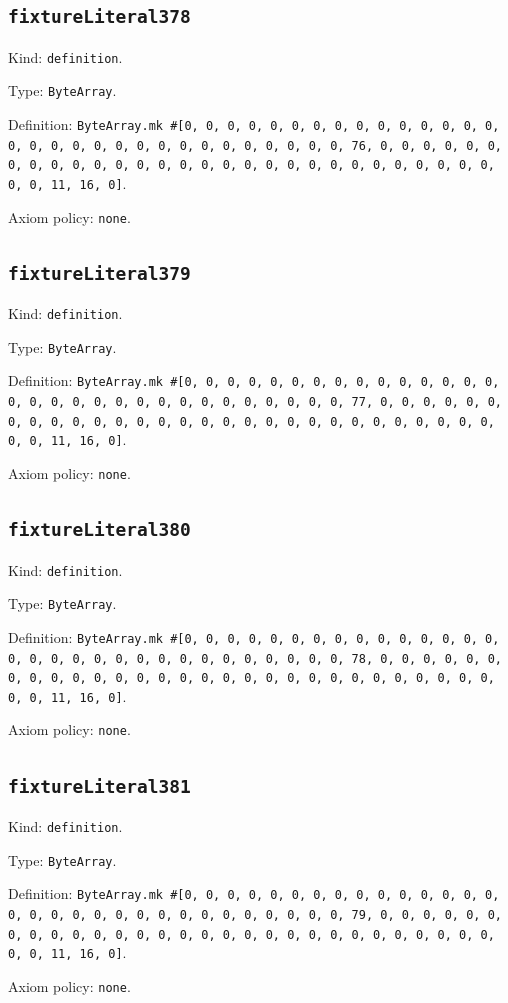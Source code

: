 \documentclass[11pt]{article}
\begin{document}
\subsection*{\texttt{fixtureLiteral378}}
\noindent Kind: \texttt{definition}.\par
\noindent Type: \texttt{ByteArray}.\par
\noindent Definition: \texttt{ByteArray.mk \#[0, 0, 0, 0, 0, 0, 0, 0, 0, 0, 0, 0, 0, 0, 0, 0, 0, 0, 0, 0, 0, 0, 0, 0, 0, 0, 0, 0, 0, 0, 0, 76, 0, 0, 0, 0, 0, 0, 0, 0, 0, 0, 0, 0, 0, 0, 0, 0, 0, 0, 0, 0, 0, 0, 0, 0, 0, 0, 0, 0, 0, 0, 0, 11, 16, 0]}.\par
\noindent Axiom policy: \texttt{none}.\par
\subsection*{\texttt{fixtureLiteral379}}
\noindent Kind: \texttt{definition}.\par
\noindent Type: \texttt{ByteArray}.\par
\noindent Definition: \texttt{ByteArray.mk \#[0, 0, 0, 0, 0, 0, 0, 0, 0, 0, 0, 0, 0, 0, 0, 0, 0, 0, 0, 0, 0, 0, 0, 0, 0, 0, 0, 0, 0, 0, 0, 77, 0, 0, 0, 0, 0, 0, 0, 0, 0, 0, 0, 0, 0, 0, 0, 0, 0, 0, 0, 0, 0, 0, 0, 0, 0, 0, 0, 0, 0, 0, 0, 11, 16, 0]}.\par
\noindent Axiom policy: \texttt{none}.\par
\subsection*{\texttt{fixtureLiteral380}}
\noindent Kind: \texttt{definition}.\par
\noindent Type: \texttt{ByteArray}.\par
\noindent Definition: \texttt{ByteArray.mk \#[0, 0, 0, 0, 0, 0, 0, 0, 0, 0, 0, 0, 0, 0, 0, 0, 0, 0, 0, 0, 0, 0, 0, 0, 0, 0, 0, 0, 0, 0, 0, 78, 0, 0, 0, 0, 0, 0, 0, 0, 0, 0, 0, 0, 0, 0, 0, 0, 0, 0, 0, 0, 0, 0, 0, 0, 0, 0, 0, 0, 0, 0, 0, 11, 16, 0]}.\par
\noindent Axiom policy: \texttt{none}.\par
\subsection*{\texttt{fixtureLiteral381}}
\noindent Kind: \texttt{definition}.\par
\noindent Type: \texttt{ByteArray}.\par
\noindent Definition: \texttt{ByteArray.mk \#[0, 0, 0, 0, 0, 0, 0, 0, 0, 0, 0, 0, 0, 0, 0, 0, 0, 0, 0, 0, 0, 0, 0, 0, 0, 0, 0, 0, 0, 0, 0, 79, 0, 0, 0, 0, 0, 0, 0, 0, 0, 0, 0, 0, 0, 0, 0, 0, 0, 0, 0, 0, 0, 0, 0, 0, 0, 0, 0, 0, 0, 0, 0, 11, 16, 0]}.\par
\noindent Axiom policy: \texttt{none}.\par
\end{document}
